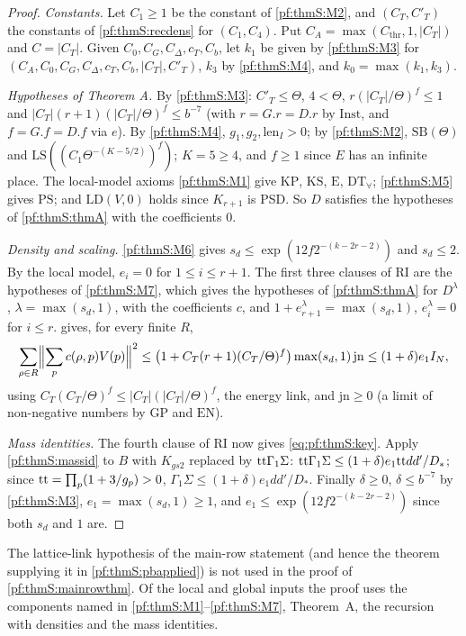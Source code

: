 \begin{proof}
\emph{Constants.} Let $C_1\ge1$ be the constant of \ref{pf:thmS:M2}, and $(C_T,C'_T)$ the constants of
\cref{pf:thmS:recdens} for $(C_1,C_4)$. Put $C_A=\max(C_{\mathrm{thr}},1,|C_T|)$ and $C=|C_T|$. Given
$C_0,C_G,C_\Delta,c_T,C_b$, let $k_1$ be given by \ref{pf:thmS:M3} for $(C_A,C_0,C_G,C_\Delta,c_T,C_b,|C_T|,C'_T)$, $k_3$ by
\ref{pf:thmS:M4}, and $k_0=\max(k_1,k_3)$.

\emph{Hypotheses of Theorem A.} By \ref{pf:thmS:M3}: $C'_T\le\Theta$, $4<\Theta$, $r(|C_T|/\Theta)^f\le1$ and
$|C_T|(r+1)(|C_T|/\Theta)^f\le b^{-7}$ (with $r=G.r=D.r$ by $\mathrm{Inst}$, and $f=G.f=D.f$ via $e$). By
\ref{pf:thmS:M4}, $g_1,g_2,\mathrm{len}_I>0$; by \ref{pf:thmS:M2}, $\mathrm{SB}(\Theta)$ and
$\mathrm{LS}((C_1\Theta^{-(K-5/2)})^f)$; $K=5\ge4$, and $f\ge1$ since $E$ has an infinite place. The
local-model axioms \ref{pf:thmS:M1} give $\mathrm{KP}$, $\mathrm{KS}$, $\mathrm{E}$, $\mathrm{DT}_{\forall}$;
\ref{pf:thmS:M5} gives $\mathrm{PS}$; and $\mathrm{LD}(V,0)$ holds since $K_{r+1}$ is PSD. So
$D$ satisfies the hypotheses of \cref{pf:thmS:thmA} with the coefficients $0$.

\emph{Density and scaling.} \ref{pf:thmS:M6} gives $s_d\le\exp(12f2^{-(k-2r-2)})$ and $s_d\le2$. By the local model,
$e_i=0$ for $1\le i\le r+1$. The first three clauses of $\mathrm{RI}$ are the hypotheses of \ref{pf:thmS:M7}, which
gives the hypotheses of \cref{pf:thmS:thmA} for $D^\lambda$, $\lambda=\max(s_d,1)$, with the coefficients $c$, and
$1+e^\lambda_{r+1}=\max(s_d,1)$, $e^\lambda_i=0$ for $i\le r$.  gives, for every finite $R$,
\[
\sum_{\rho\in R}\Bigl\|\sum_pc(\rho,p)V(p)\Bigr\|^2\le\bigl(1+C_T(r+1)(C_T/\Theta)^f\bigr)\max(s_d,1)\,\mathrm{jn}\le(1+\delta)e_1I_N,
\]
using $C_T(C_T/\Theta)^f\le|C_T|(|C_T|/\Theta)^f$, the energy link, and $\mathrm{jn}\ge0$ (a limit of non-negative numbers by
$\mathrm{GP}$ and $\mathrm{EN}$).

\emph{Mass identities.} The fourth clause of $\mathrm{RI}$ now gives \eqref{eq:pf:thmS:key}. Apply
\cref{pf:thmS:massid} to $B$ with $K_{gs2}$ replaced by $\mathrm{tt}\Gamma_1\Sigma$: $\mathrm{tt}\Gamma_1\Sigma\le(1+\delta)e_1\mathrm{tt}
dd'/D_*$; since $\mathrm{tt}=\prod_p(1+3/g_p)>0$, $\Gamma_1\Sigma\le(1+\delta)e_1dd'/D_*$. Finally $\delta\ge0$, $\delta\le b^{-7}$ by
\ref{pf:thmS:M3}, $e_1=\max(s_d,1)\ge1$, and $e_1\le\exp(12f2^{-(k-2r-2)})$ since both $s_d$ and $1$ are.
\end{proof}

\begin{remark}\label{pf:thmS:latticelinkunused}
The lattice-link hypothesis of the main-row statement (and hence the theorem
 supplying it in
\cref{pf:thmS:pbapplied}) is not used in the proof of \cref{pf:thmS:mainrowthm}. Of the local and global inputs the proof uses the components named in \ref{pf:thmS:M1}--\ref{pf:thmS:M7}, Theorem~A, the
recursion with densities and the mass identities.
\end{remark}

